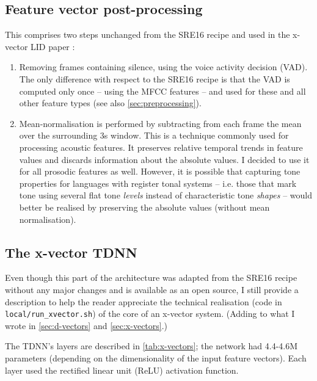 \documentclass[bsc,frontabs,twoside,singlespacing,parskip,deptreport]{infthesis}
\begin{document}
{{    \subsection{Feature vector post-processing}{
      \label{sec:feature-postprocessing}
      This comprises two steps unchanged from the SRE16 recipe and used in the x-vector LID paper \citep{Snyder_et_al_2018}:
      \begin{enumerate}
        \item {Removing frames containing silence, using the voice activity decision (VAD). The only difference with respect to the SRE16 recipe is that the VAD is computed only once -- using the MFCC features -- and used for these and all other feature types (see also \autoref{sec:preprocessing}).}
        \item {Mean-normalisation is performed by subtracting from each frame the mean over the surrounding 3s window. This is a technique commonly used for processing acoustic features. It preserves relative temporal trends in feature values and discards information about the absolute values. I decided to use it for all prosodic features as well. However, it is possible that capturing tone properties for languages with register tonal systems -- i.e. those that mark tone using several flat tone \textit{levels} instead of characteristic tone \textit{shapes} -- would better be realised by preserving the absolute values (without mean normalisation).}
      \end{enumerate}
    }

    \subsection{The x-vector TDNN}{
      \label{sec:x-vector-tdnn}
      Even though this part of the architecture was adapted from the SRE16 recipe without any major changes and is available as an open source, I still provide a description to help the reader appreciate the technical realisation (code in \verb|local/run_xvector.sh|) of the core of an x-vector system. (Adding to what I wrote in \autoref{sec:d-vectors} and \autoref{sec:x-vectors}.)

      The TDNN's layers are described in \autoref{tab:x-vectors}; the network had 4.4-4.6M parameters (depending on the dimensionality of the input feature vectors). Each layer used the rectified linear unit (ReLU) activation function.

}}}
\end{document}
